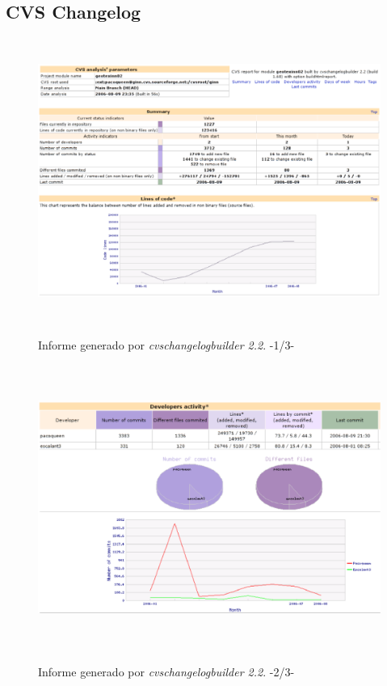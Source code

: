 \documentclass[a4paper]{article}
\begin{document}
        \subsection{CVS Changelog}
        \begin{figure}[!ht]
            \centering
                    \includegraphics[width=12.5cm,height=9.3cm]{cvs0.eps}\\
                \caption{Informe generado por \emph{cvschangelogbuilder 2.2}. -1/3-}
                \label{cvs0}
        \end{figure}\par
        \begin{figure}[!ht]
            \centering
                    \includegraphics[width=12.5cm,height=9.3cm]{cvs1.eps}\\
                \caption{Informe generado por \emph{cvschangelogbuilder 2.2}. -2/3-}
                \label{cvs1}
        \end{figure}\par
\end{document}
